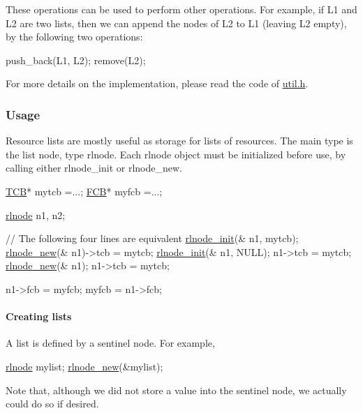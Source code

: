 These operations can be used to perform other operations. For example, if L1 and L2 are two lists, then we can append the nodes of L2 to L1 (leaving L2 empty), by the following two operations\-: \begin{DoxyVerb}push_back(L1, L2);
remove(L2);
\end{DoxyVerb}


For more details on the implementation, please read the code of \hyperlink{util_8h}{util.\-h}.

\subsubsection*{Usage }

Resource lists are mostly useful as storage for lists of resources. The main type is the list node, type {\ttfamily rlnode}. Each {\ttfamily rlnode} object must be initialized before use, by calling either {\ttfamily rlnode\-\_\-init} or {\ttfamily rlnode\-\_\-new}. 
\begin{DoxyCode}
\hyperlink{structthread__control__block}{TCB}* mytcb =...;
\hyperlink{structfile__control__block}{FCB}* myfcb =...;

\hyperlink{structresource__list__node}{rlnode} n1, n2;

\textcolor{comment}{// The following four lines are equivalent }
\hyperlink{group__rlists_ga578e6dc256d4f1580bd8500edf374aca}{rlnode\_init}(& n1, mytcb); 
\hyperlink{group__rlists_gaccdb4bce65952fede472de20297eb36e}{rlnode\_new}(& n1)->tcb = mytcb;
\hyperlink{group__rlists_ga578e6dc256d4f1580bd8500edf374aca}{rlnode\_init}(& n1, NULL);  n1->tcb = mytcb;
\hyperlink{group__rlists_gaccdb4bce65952fede472de20297eb36e}{rlnode\_new}(& n1);  n1->tcb = mytcb;


n1->fcb = myfcb;
myfcb = n1->fcb;
\end{DoxyCode}


\paragraph*{Creating lists}

A list is defined by a sentinel node. For example, 
\begin{DoxyCode}
\hyperlink{structresource__list__node}{rlnode} mylist;  
\hyperlink{group__rlists_gaccdb4bce65952fede472de20297eb36e}{rlnode\_new}(&mylist);
\end{DoxyCode}
 Note that, although we did not store a value into the sentinel node, we actually could do so if desired.

